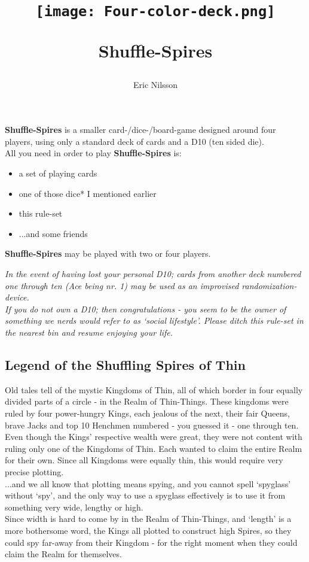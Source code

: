 \documentclass[11pt]{article} %
\title{
\begin{figure}[htb]
\centering
\texttt{[image: Four-color-deck.png]}
\label{Logo}
\end{figure}
Shuffle-Spires
}
\author{Eric Nilsson}
\date{}
\begin{document}
\maketitle

\noindent
\textbf{Shuffle-Spires} is a smaller card-/dice-/board-game designed around four players, using only a standard deck of cards and a D10 (ten sided die). \\
All you need in order to play \textbf{Shuffle-Spires} is:
\begin{itemize}
\renewcommand{\labelitemi}{$\bullet$}
\item a set of playing cards
\item one of those dice* I mentioned earlier
\item this rule-set
\item ...and some friends
\end{itemize}
\textbf{Shuffle-Spires} may be played with two or four players.

\noindent
{\it*In the event of having lost your personal D10; cards from another deck numbered one through ten (Ace being nr. 1) may be used as an improvised randomization-device.} \\
{\it*If you do not own a D10; then congratulations - you seem to be the owner of something we nerds would refer to as ‘social lifestyle’. Please ditch this rule-set in the nearest bin and resume enjoying your life.}

\subsection{Legend of the Shuffling Spires of Thin}
Old tales tell of the mystic Kingdoms of Thin, all of which border in four equally divided parts of a circle - in the Realm of Thin-Things.
These kingdoms were ruled by four power-hungry Kings, each jealous of the next, their fair Queens, brave Jacks and top 10 Henchmen numbered - you guessed it - one through ten. \\
Even though the Kings’ respective wealth were great, they were not content with ruling only one of the Kingdoms of Thin. Each wanted to claim the entire Realm for their own. Since all Kingdoms were equally thin, this would require very precise plotting. \\
...and we all know that plotting means spying, and you cannot spell ‘spyglass’ without ‘spy’, and the only way to use a spyglass effectively is to use it from something very wide, lengthy or high. \\ 
\noindent
Since width is hard to come by in the Realm of Thin-Things, and ‘length’ is a more bothersome word, the Kings all plotted to construct high Spires, so they could spy far-away from their Kingdom - for the right moment when they could claim the Realm for themselves.
\end{document}
